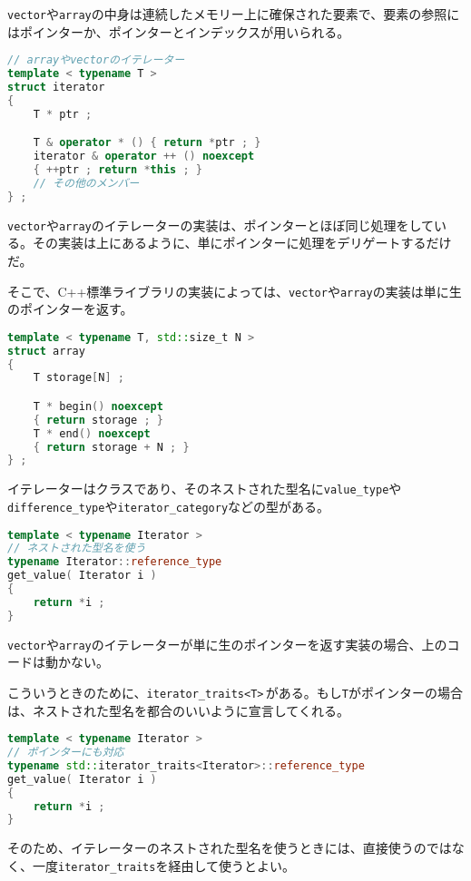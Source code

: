 \texttt{vector}や\texttt{array}の中身は連続したメモリー上に確保された要素で、要素の参照にはポインターか、ポインターとインデックスが用いられる。

\begin{lstlisting}[language={C++}]
// arrayやvectorのイテレーター
template < typename T >
struct iterator
{
    T * ptr ;

    T & operator * () { return *ptr ; }
    iterator & operator ++ () noexcept
    { ++ptr ; return *this ; }
    // その他のメンバー
} ;
\end{lstlisting}

\texttt{vector}や\texttt{array}のイテレーターの実装は、ポインターとほぼ同じ処理をしている。その実装は上にあるように、単にポインターに処理をデリゲートするだけだ。

そこで、C++標準ライブラリの実装によっては、\texttt{vector}や\texttt{array}の実装は単に生のポインターを返す。

\begin{lstlisting}[language={C++}]
template < typename T, std::size_t N >
struct array
{
    T storage[N] ;

    T * begin() noexcept
    { return storage ; }
    T * end() noexcept
    { return storage + N ; }
} ;
\end{lstlisting}

イテレーターはクラスであり、そのネストされた型名に\texttt{value\_type}や\texttt{difference\_type}や\texttt{iterator\_category}などの型がある。

\begin{lstlisting}[language={C++}]
template < typename Iterator >
// ネストされた型名を使う
typename Iterator::reference_type
get_value( Iterator i )
{
    return *i ;
}
\end{lstlisting}

\texttt{vector}や\texttt{array}のイテレーターが単に生のポインターを返す実装の場合、上のコードは動かない。

こういうときのために、\texttt{iterator\_traits<T>}\,がある。もし\texttt{T}がポインターの場合は、ネストされた型名を都合のいいように宣言してくれる。

\begin{lstlisting}[language={C++}]
template < typename Iterator >
// ポインターにも対応
typename std::iterator_traits<Iterator>::reference_type
get_value( Iterator i )
{
    return *i ;
}
\end{lstlisting}

そのため、イテレーターのネストされた型名を使うときには、直接使うのではなく、一度\texttt{iterator\_traits}を経由して使うとよい。

